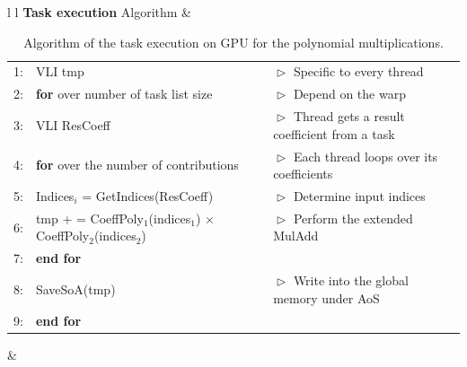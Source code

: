 \documentclass[oribibl]{llncs2e/llncs}
\begin{document}
\begin{enumerate}
 \begin{table}[t] 
	\begin{center}
	 	\begin{tabular}{l l}
                           \hline 
                           \textbf{Task execution}  Algorithm &  \\ \hline
                           \begin{tabular}{c l l} 
                               \tiny{1:} & VLI tmp   &  $\vartriangleright$ Specific to every thread  \\
                               \tiny{2:} &  \textbf{for} over number of task list size &$\vartriangleright$  Depend on the warp \\
                               \tiny{3:} &   VLI ResCoeff &$\vartriangleright$  Thread gets a result coefficient from a task \\
                               \tiny{4:} &  \hspace{0.2 cm}  \textbf{for} over the number of contributions  & $\vartriangleright$ Each thread loops over its coefficients \\
                               \tiny{5:} &  \hspace{0.4 cm}   Indices$_i$ = GetIndices(ResCoeff) &$\vartriangleright$ Determine input indices \\
                               \tiny{6:} &  \hspace{0.4 cm}   tmp + = CoeffPoly$_1$(indices$_1$) $\times$ CoeffPoly$_2$(indices$_2$) &$\vartriangleright$ Perform the extended MulAdd  \\
                               \tiny{7:} &  \hspace{0.2 cm}   \textbf{end for} &\\
                               \tiny{8:} &  SaveSoA(tmp) & $\vartriangleright$ Write into the global memory under AoS \\                               
                               \tiny{9:} &  \textbf{end for} &\\                               
                          \end{tabular} &  \\ \hline
		 \end{tabular} 
		 \caption{Algorithm of the task execution on GPU for the polynomial multiplications. \label{ALGO}}
	\end{center}
\end{table} 


\end{enumerate}
\end{document}

